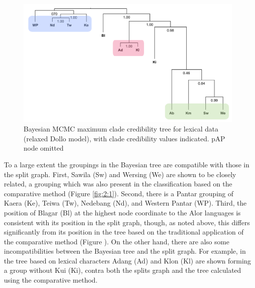 \begin{figure}
\includegraphics[width=\textwidth]{figures/holton_ch2_fig4.pdf}
\caption{Bayesian MCMC maximum clade credibility tree for lexical data (relaxed Dollo model), with clade credibility values indicated. pAP node omitted}
\label{fig:2:bayes_mcc}
\end{figure}

To a large extent the groupings in the Bayesian tree are compatible with those in the split graph. First, Sawila (Sw) and Wersing (We) are shown to be closely related, a grouping which was also present in the classification based on the comparative method (Figure \ref{fig:2:1}). Second, there is a Pantar grouping of Kaera (Ke), Teiwa (Tw), Nedebang (Nd), and Western Pantar (WP). Third, the position of Blagar (Bl) at the highest node coordinate to the Alor languages is consistent with its position in the split graph, though, as noted above, this differs significantly from its position in the tree based on the traditional application of the comparative method (Figure ). On the other hand, there are also some incompatibilities between the Bayesian tree and the split graph. For example, in the tree based on lexical characters Adang (Ad) and Klon (Kl) are shown forming a group without Kui (Ki), contra both the splits graph and the tree calculated using the comparative method. 

